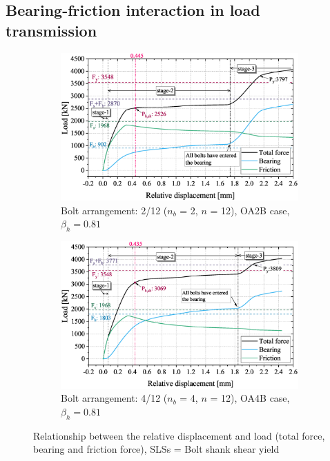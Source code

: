 \subsection{Bearing-friction interaction in load transmission}

\begin{figure}
\centering

\begin{subfigure}[b]{0.85\textwidth}
    \centering
    \includegraphics[width=\textwidth]{imgs/ch7/LD-OAP2B.eps}
    \caption{Bolt arrangement: 2/12 ($n_b$ = 2, $n$ = 12), OA2B case, $\beta_h = 0.81$}
    \label{fig-ldoa2b}
\end{subfigure}
\hfill
\begin{subfigure}[b]{0.85\textwidth}
    \centering
    \includegraphics[width=\textwidth]{imgs/ch7/LD-OA4B.eps}
    \caption{Bolt arrangement: 4/12 ($n_b$ = 4, $n$ = 12), OA4B case, $\beta_h = 0.81$}
    \label{fig-ldoa4b}
\end{subfigure}

\caption{Relationship between the relative displacement and load (total force, bearing and friction force), SLSs = Bolt shank shear yield}
\label{fig-loadrd-beaf}
\end{figure}

